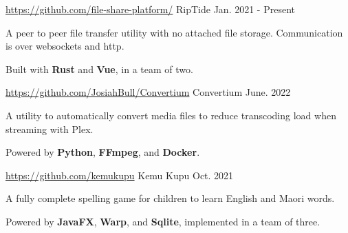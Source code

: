
\begin{cventries}
  \cventry
    {\href{https://github.com/file-share-platform}{\faLink \space https://github.com/file-share-platform/}} %
    {RipTide} %
    {} %
    {Jan. 2021 - Present} %
    {
      \begin{cvitems} %
        \item {A peer to peer file transfer utility with no attached file storage. Communication is over websockets and http.}
        \item {Built with \textbf{Rust} and \textbf{Vue}, in a team of two.}
      \end{cvitems}
    }

  \cventry
  {\href{https://github.com/JosiahBull/Convertium}{\faLink \space https://github.com/JosiahBull/Convertium}} %
  {Convertium} %
  {} %
  {June. 2022} %
  {
    \begin{cvitems} %
      \item {A utility to automatically convert media files to reduce transcoding load when streaming with Plex.}
      \item {Powered by \textbf{Python}, \textbf{FFmpeg}, and \textbf{Docker}.}
    \end{cvitems}
  }

  \cventry
    {\href{https://github.com/kemukupu}{\faLink \space https://github.com/kemukupu}} %
    {Kemu Kupu} %
    {} %
    {Oct. 2021} %
    {
      \begin{cvitems} %
        \item {A fully complete spelling game for children to learn English and Maori words.}
        \item {Powered by \textbf{JavaFX}, \textbf{Warp}, and \textbf{Sqlite}, implemented in a team of three.}
      \end{cvitems}
    }

\end{cventries}

